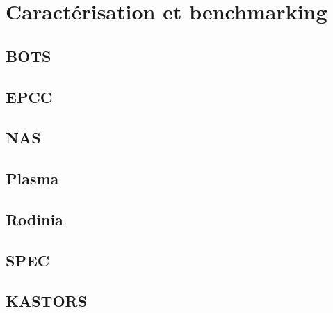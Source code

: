 \section{Caractérisation et benchmarking}\label{sec:rw:benchmarking}


\subsection{BOTS}
\subsection{EPCC}
\subsection{NAS}
\subsection{Plasma}
\subsection{Rodinia}
\subsection{SPEC}
\subsection{KASTORS}

